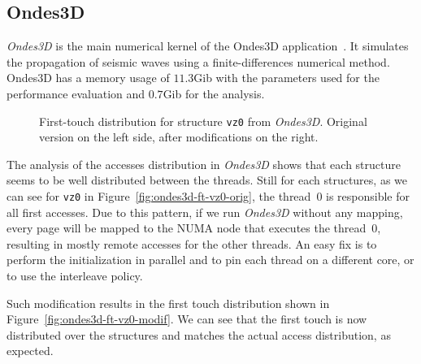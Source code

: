 \subsection{Ondes3D}
\label{sec:exp-ondes3d}

\emph{Ondes3D} is the main numerical kernel of the Ondes3D
application~\cite{Dupros2008}. It simulates the propagation of seismic waves
using a finite-differences numerical method. Ondes3D has a memory usage of
$11.3$Gib with the parameters used for the performance evaluation and $0.7$Gib
for the analysis.

\begin{figure}[htb]
    \centering

    \caption{First-touch distribution  for structure
        \texttt{vz0} from \emph{Ondes3D}. Original version on the left side,
    after modifications on the right.}
    \label{fig:ondes3d}
\end{figure}

The analysis of the accesses distribution in \emph{Ondes3D} shows that each
structure seems to be well distributed between the threads. %
Still for each structures, as we can see for \texttt{vz0} in
Figure~\ref{fig:ondes3d-ft-vz0-orig}, the
thread~$0$ is responsible for all first accesses. Due to
this pattern, if we run \emph{Ondes3D} without any mapping, every page will be
mapped to the NUMA node that executes the thread~$0$, resulting in mostly remote
accesses for the other threads. An easy fix is to perform the initialization
in parallel and to pin each thread on a different core, or to use the
interleave policy.

Such modification results in the first touch distribution shown in
Figure~\ref{fig:ondes3d-ft-vz0-modif}. We can see that the first touch is now distributed
over the structures and matches the actual access distribution, as expected.

